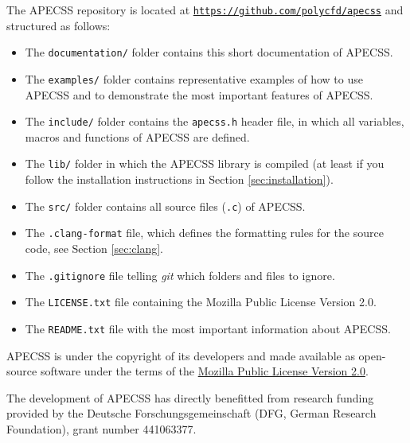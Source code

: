 The APECSS repository is located at \href{https://github.com/polycfd/apecss}{\texttt{https://github.com/polycfd/apecss}} and structured as follows:\vspace{-1em}
\begin{itemize}[noitemsep]
    \item The {\tt documentation/} folder contains this short documentation of APECSS.
    \item The {\tt examples/} folder contains representative examples of how to use APECSS and to demonstrate the most important features of APECSS. 
    \item The {\tt include/} folder contains the {\tt apecss.h} header file, in which all variables, macros and functions of APECSS are defined.
    \item The {\tt lib/} folder in which the APECSS library is compiled (at least if you follow the installation instructions in Section \ref{sec:installation}).
    \item The {\tt src/} folder contains all source files ({\tt *.c}) of APECSS.
    \item The {\tt .clang-format} file, which defines the formatting rules for the source code, see Section \ref{sec:clang}.
    \item The {\tt .gitignore} file telling \textit{git} which folders and files to ignore.
    \item The {\tt LICENSE.txt} file containing the Mozilla Public License Version 2.0.
    \item The {\tt README.txt} file with the most important information about APECSS.
\end{itemize}

APECSS is under the copyright of its developers and made available as open-source software under the terms of the \href{https://www.mozilla.org/en-US/MPL/2.0/}{Mozilla Public License Version 2.0}.

The development of APECSS has directly benefitted from research funding provided by the Deutsche Forschungsgemeinschaft (DFG, German Research Foundation), grant number 441063377.
